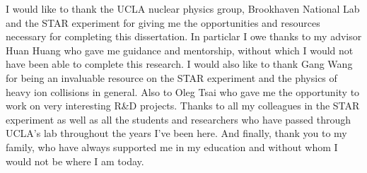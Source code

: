 I would like to thank the UCLA nuclear physics group, Brookhaven National Lab and the STAR experiment for giving me the opportunities and resources necessary for completing this dissertation. In particlar I owe thanks to my advisor Huan Huang who gave me guidance and mentorship, without which I would not have been able to complete this research. I would also like to thank Gang Wang for being an invaluable resource on the STAR experiment and the physics of heavy ion collisions in general. Also to Oleg Tsai who gave me the opportunity to work on very interesting R\&D projects. Thanks to all my colleagues in the STAR experiment as well as all the students and researchers who have passed through UCLA's lab throughout the years I've been here. And finally, thank you to my family, who have always supported me in my education and without whom I would not be where I am today.    
